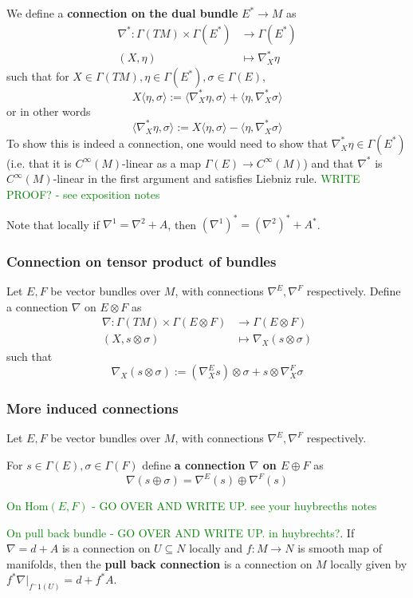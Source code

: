 \documentclass[a4paper]{article}
\theoremstyle{definition} \newtheorem*{definition}{Definition}
\theoremstyle{definition} \newtheorem*{definitions}{Definitions}
\theoremstyle{plain} \newtheorem{theorem}{Theorem}[section]
\theoremstyle{plain} \newtheorem{proposition}[theorem]{Proposition}
\theoremstyle{plain} \newtheorem{corollary}[theorem]{Corollary}
\theoremstyle{plain} \newtheorem{lemma}[theorem]{Lemma}
\theoremstyle{plain} \newtheorem{example}[theorem]{Example}
\newcommand{\finish}[1]{\textcolor{green}{#1}}
\newcommand{\defn}[1]{\textbf{#1}}
\newcommand{\Hom}{\text{Hom}}
\newcommand{\smooth}{C^\infty}
\begin{document}
We define a \defn{connection on the dual bundle} $E^*\to M$ as 
\begin{align*}
    \nabla^* :  \Gamma(TM)\times \Gamma(E^*) & \to \Gamma(E^*) \\
    (X, \eta) & \mapsto \nabla^*_X \eta
\end{align*}
such that for $X\in \Gamma(TM), \eta\in \Gamma(E^*), \sigma\in \Gamma(E)$,
$$X \langle \eta, \sigma \rangle := \langle \nabla^*_X \eta , \sigma \rangle + \langle \eta, \nabla^*_X \sigma \rangle$$
or in other words
$$ \langle \nabla^*_X \eta , \sigma \rangle := X \langle \eta, \sigma \rangle - \langle \eta, \nabla^*_X \sigma \rangle$$
To show this is indeed a connection, one would need to show that $\nabla^*_X \eta \in \Gamma(E^*)$ (i.e. that it is $\smooth(M)$-linear as a map $\Gamma(E)\to \smooth(M)$) and that $\nabla^*$ is $\smooth(M)$-linear in the first argument and satisfies Liebniz rule. \finish{WRITE PROOF? - see exposition notes}

Note that locally if $\nabla^1 = \nabla^2 + A$, then $(\nabla^1)^* = (\nabla^2)^* + A^*$.

\subsubsection{Connection on tensor product of bundles}
Let $E, F$ be vector bundles over $M$, with connections $\nabla^E, \nabla^F$ respectively.
Define a connection $\nabla$ on $E\otimes F$ as
\begin{align*}
    \nabla : \Gamma(TM)\times \Gamma(E\otimes F) & \to \Gamma(E\otimes F) \\
    (X, s\otimes \sigma) & \mapsto \nabla_X(s\otimes \sigma)
\end{align*}
such that
$$\nabla_X(s\otimes \sigma):=(\nabla^E_X s)\otimes \sigma + s \otimes \nabla^F_X \sigma $$

\subsubsection{More induced connections}
Let $E, F$ be vector bundles over $M$, with connections $\nabla^E, \nabla^F$ respectively. 

For $s\in \Gamma(E), \sigma \in \Gamma(F)$ define \defn{a connection $\nabla$ on $E\oplus F$} as
$$\nabla(s\oplus \sigma)=\nabla^E(s)\oplus \nabla^F(s)$$

\finish{On $\Hom(E, F)$ - GO OVER AND WRITE UP. see your huybrecths notes} 

\finish{On pull back bundle - GO OVER AND WRITE UP. in huybrechts?}. If $\nabla = d+A$ is a connection on $U\subseteq N$ locally and $f:M\to N$ is smooth map of manifolds, then the \defn{pull back connection} is a connection on $M$ locally given by $f^*\nabla |_{f^-1(U)}=d+f^*A$.
\end{document}
